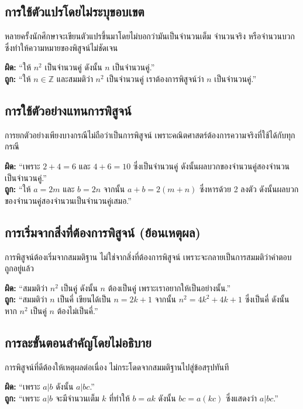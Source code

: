 \subsection*{การใช้ตัวแปรโดยไม่ระบุขอบเขต}
หลายครั้งนักศึกษาจะเขียนตัวแปรขึ้นมาโดยไม่บอกว่ามันเป็นจำนวนเต็ม จำนวนจริง หรือจำนวนบวก ซึ่งทำให้ความหมายของพิสูจน์ไม่ชัดเจน  
\begin{exam}
	\textbf{ผิด:} “ให้ $n^2$ เป็นจำนวนคู่ ดังนั้น $n$ เป็นจำนวนคู่.”\\
	\textbf{ถูก:} “ให้ $n \in \mathbb{Z}$ และสมมติว่า $n^2$ เป็นจำนวนคู่ เราต้องการพิสูจน์ว่า $n$ เป็นจำนวนคู่.”
\end{exam}

\subsection*{การใช้ตัวอย่างแทนการพิสูจน์}
การยกตัวอย่างเพียงบางกรณีไม่ถือว่าเป็นการพิสูจน์ เพราะคณิตศาสตร์ต้องการความจริงที่ใช้ได้กับทุกกรณี  
\begin{exam}
	\textbf{ผิด:} “เพราะ $2+4=6$ และ $4+6=10$ ซึ่งเป็นจำนวนคู่ ดังนั้นผลบวกของจำนวนคู่สองจำนวนเป็นจำนวนคู่.”\\
	\textbf{ถูก:} “ให้ $a=2m$ และ $b=2n$ จากนั้น $a+b=2(m+n)$ ซึ่งหารด้วย 2 ลงตัว ดังนั้นผลบวกของจำนวนคู่สองจำนวนเป็นจำนวนคู่เสมอ.”
\end{exam}

\subsection*{การเริ่มจากสิ่งที่ต้องการพิสูจน์ (ย้อนเหตุผล)}
การพิสูจน์ต้องเริ่มจากสมมติฐาน ไม่ใช่จากสิ่งที่ต้องการพิสูจน์ เพราะจะกลายเป็นการสมมติว่าคำตอบถูกอยู่แล้ว  
\begin{exam}
	\textbf{ผิด:} “สมมติว่า $n^2$ เป็นคู่ ดังนั้น $n$ ต้องเป็นคู่ เพราะเราอยากให้เป็นอย่างนั้น.”\\
	\textbf{ถูก:} “สมมติว่า $n$ เป็นคี่ เขียนได้เป็น $n=2k+1$ จากนั้น $n^2=4k^2+4k+1$ ซึ่งเป็นคี่ ดังนั้นหาก $n^2$ เป็นคู่ $n$ ต้องไม่เป็นคี่.”
\end{exam}

\subsection*{การละขั้นตอนสำคัญโดยไม่อธิบาย}
การพิสูจน์ที่ดีต้องให้เหตุผลต่อเนื่อง ไม่กระโดดจากสมมติฐานไปสู่ข้อสรุปทันที  
\begin{exam}
	\textbf{ผิด:} “เพราะ $a|b$ ดังนั้น $a|bc$.”\\
	\textbf{ถูก:} “เพราะ $a|b$ จะมีจำนวนเต็ม $k$ ที่ทำให้ $b=ak$ ดังนั้น $bc = a(kc)$ ซึ่งแสดงว่า $a|bc$.”
\end{exam}

